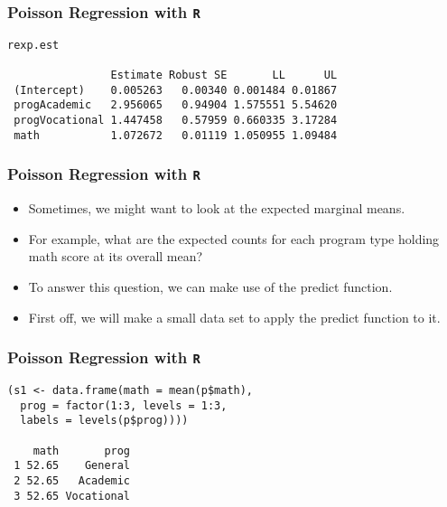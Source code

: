\documentclass[00-GLMregslides.tex]{subfiles}
\begin{document}
\begin{frame}[fragile]

\frametitle{Poisson Regression with \texttt{R}}

\begin{framed}
\begin{verbatim}
rexp.est
 
                Estimate Robust SE       LL      UL
 (Intercept)    0.005263   0.00340 0.001484 0.01867
 progAcademic   2.956065   0.94904 1.575551 5.54620
 progVocational 1.447458   0.57959 0.660335 3.17284
 math           1.072672   0.01119 1.050955 1.09484
\end{verbatim}
\end{framed}
\end{frame}


\begin{frame}[fragile]

\frametitle{Poisson Regression with \texttt{R}}
\Large
\begin{itemize}
\item Sometimes, we might want to look at the expected marginal means. 
\item For example, what are the expected counts for each program type holding math score at its overall mean? 
\item To answer this question, we can make use of the predict function. 
\item First off, we will make a small data set to apply the predict function to it.
\end{itemize}

\end{frame}

\begin{frame}[fragile]

\frametitle{Poisson Regression with \texttt{R}}
\normalsize 

\begin{framed}
\begin{verbatim}
(s1 <- data.frame(math = mean(p$math),
  prog = factor(1:3, levels = 1:3, 
  labels = levels(p$prog))))
 
    math       prog
 1 52.65    General
 2 52.65   Academic
 3 52.65 Vocational
\end{verbatim}
\end{framed}
\end{frame}
\end{document}
